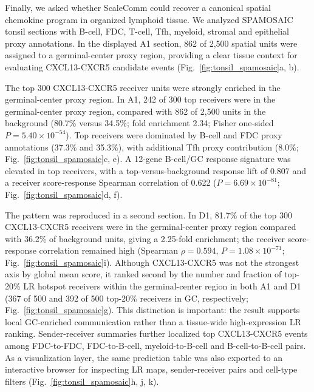 \documentclass[referee,lineno,pdflatex,sn-vancouver-num]{sn-jnl}
\begin{document}
Finally, we asked whether ScaleComm could recover a canonical spatial chemokine program in organized lymphoid tissue. We analyzed SPAMOSAIC tonsil sections with B-cell, FDC, T-cell, Tfh, myeloid, stromal and epithelial proxy annotations. In the displayed A1 section, 862 of 2,500 spatial units were assigned to a germinal-center proxy region, providing a clear tissue context for evaluating CXCL13-CXCR5 candidate events (Fig.~\ref{fig:tonsil_spamosaic}a, b).

The top 300 CXCL13-CXCR5 receiver units were strongly enriched in the germinal-center proxy region. In A1, 242 of 300 top receivers were in the germinal-center proxy region, compared with 862 of 2,500 units in the background (80.7\% versus 34.5\%; fold enrichment 2.34; Fisher one-sided $P=5.40 \times 10^{-54}$). Top receivers were dominated by B-cell and FDC proxy annotations (37.3\% and 35.3\%), with additional Tfh proxy contribution (8.0\%; Fig.~\ref{fig:tonsil_spamosaic}c, e). A 12-gene B-cell/GC response signature was elevated in top receivers, with a top-versus-background response lift of 0.807 and a receiver score-response Spearman correlation of 0.622 ($P=6.69 \times 10^{-81}$; Fig.~\ref{fig:tonsil_spamosaic}d, f).

The pattern was reproduced in a second section. In D1, 81.7\% of the top 300 CXCL13-CXCR5 receivers were in the germinal-center proxy region compared with 36.2\% of background units, giving a 2.25-fold enrichment; the receiver score-response correlation remained high (Spearman $\rho=0.594$, $P=1.08 \times 10^{-71}$; Fig.~\ref{fig:tonsil_spamosaic}i). Although CXCL13-CXCR5 was not the strongest axis by global mean score, it ranked second by the number and fraction of top-20\% LR hotspot receivers within the germinal-center region in both A1 and D1 (367 of 500 and 392 of 500 top-20\% receivers in GC, respectively; Fig.~\ref{fig:tonsil_spamosaic}g). This distinction is important: the result supports local GC-enriched communication rather than a tissue-wide high-expression LR ranking. Sender-receiver summaries further localized top CXCL13-CXCR5 events among FDC-to-FDC, FDC-to-B-cell, myeloid-to-B-cell and B-cell-to-B-cell pairs. As a visualization layer, the same prediction table was also exported to an interactive browser for inspecting LR maps, sender-receiver pairs and cell-type filters (Fig.~\ref{fig:tonsil_spamosaic}h, j, k).
\end{document}
